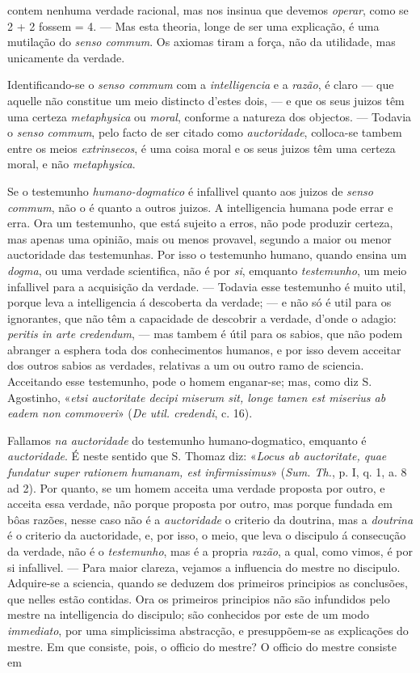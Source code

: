 contem nenhuma verdade racional, mas nos insinua que devemos \emph{operar}, como se 2 + 2 fossem = 4. --- Mas esta theoria, longe de ser uma explicação, é uma mutilação do \emph{senso commum}. Os axiomas tiram a força, não da utilidade, mas unicamente da verdade.\par Identificando-se o \emph{senso commum} com a \emph{intelligencia} e a \emph{razão}, é claro --- que aquelle não constitue um meio distincto d'estes dois, --- e que os seus juizos têm uma certeza \emph{metaphysica} ou \emph{moral}, conforme a natureza dos objectos. --- Todavia o \emph{senso commum}, pelo facto de ser citado como \emph{auctoridade}, colloca-se tambem entre os meios \emph{extrinsecos}, é uma coisa moral e os seus juizos têm uma certeza moral, e não \emph{metaphysica}.\par *\par Se o testemunho \emph{humano-dogmatico} é infallivel quanto aos juizos de \emph{senso commum}, não o é quanto a outros juizos. A intelligencia humana pode errar e erra. Ora um testemunho, que está sujeito a erros, não pode produzir certeza, mas apenas uma opinião, mais ou menos provavel, segundo a maior ou menor auctoridade das testemunhas. Por isso o testemunho humano, quando ensina um \emph{dogma}, ou uma verdade scientifica, não é por \emph{si}, emquanto \emph{testemunho}, um meio infallivel para a acquisição da verdade. --- Todavia esse testemunho é muito util, porque leva a intelligencia á descoberta da verdade; --- e não só é util para os ignorantes, que não têm a capacidade de descobrir a verdade, d'onde o adagio: \emph{peritis in arte credendum}, --- mas tambem é útil para os sabios, que não podem abranger a esphera toda dos conhecimentos humanos, e por isso devem acceitar dos outros sabios as verdades, relativas a um ou outro ramo de sciencia. Acceitando esse testemunho, pode o homem enganar-se; mas, como diz S. Agostinho, «\emph{etsi auctoritate decipi miserum sit, longe tamen est miserius ab eadem non commoveri}» (\emph{De util. credendi}, c. 16).\par Fallamos \emph{na auctoridade} do testemunho humano-dogmatico, emquanto é \emph{auctoridade}. É neste sentido que S. Thomaz diz: «\emph{Locus ab auctoritate, quae fundatur super rationem humanam, est infirmissimus}» (\emph{Sum. Th.}, p. I, q. 1, a. 8 ad 2). Por quanto, se um homem acceita uma verdade proposta por outro, e acceita essa verdade, não porque proposta por outro, mas porque fundada em bôas razões, nesse caso não é a \emph{auctoridade} o criterio da doutrina, mas a \emph{doutrina} é o criterio da auctoridade, e, por isso, o meio, que leva o discipulo á consecução da verdade, não é o \emph{testemunho}, mas é a propria \emph{razão}, a qual, como vimos, é por si infallivel. --- Para maior clareza, vejamos a influencia do mestre no discipulo. Adquire-se a sciencia, quando se deduzem dos primeiros principios as conclusões, que nelles estão contidas. Ora os primeiros principios não são infundidos pelo mestre na intelligencia do discipulo; são conhecidos por este de um modo \emph{immediato}, por uma simplicissima abstracção, e presuppõem-se as explicações do mestre. Em que consiste, pois, o officio do mestre? O officio do mestre consiste em 